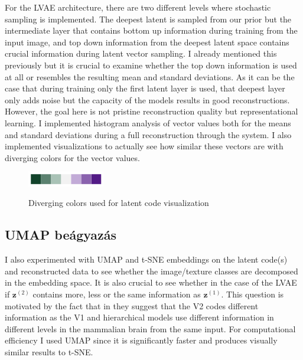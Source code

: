 \documentclass[12pt, english]{article}
\begin{document}
\vspace{4mm}

\par For the LVAE architecture, there are two different levels where stochastic sampling is implemented. The deepest latent is sampled from our prior but the intermediate layer that contains bottom up information during training from the input image, and top down information from the deepest latent space contains crucial information during latent vector sampling. I already mentioned this previously but it is crucial to examine whether the top down information is used at all or resembles the resulting mean and standard deviations. As it can be the case that during training only the first latent layer is used, that deepest layer only adds noise but the capacity of the models results in good reconstructions. However, the goal here is not pristine reconstruction quality but representational learning. I implemented histogram analysis of vector values both for the means and standard deviations during a full reconstruction through the system. I also implemented visualizations to actually see how similar these vectors are with diverging colors for the vector values.

\vspace{4mm}

\begin{figure}[H]
    \centering
    \includegraphics[width=0.3\textwidth]{diverging_color.png}
    \label{fig:diverging_colors}
    \caption{Diverging colors used for latent code visualization}
\end{figure}

\vspace{4mm}

\subsection{UMAP beágyazás}

\vspace{4mm}

\par I also experimented with UMAP \cite{mcinnes2018umap} and  t-SNE \cite{maaten2008visualizing} embeddings on the latent code(s) and reconstructed data to see whether the image/texture classes are decomposed in the embedding space. It is also crucial to see whether in the case of the LVAE if $\bm{z}^{(2)}$ contains more, less or the same information as $\bm{z}^{(1)}$. This question is motivated by the fact that in \cite{ZiembaV2} they suggest that the V2 codes different information as the V1 and hierarchical models use different information in different levels in the mammalian brain from the same input. For computational efficiency I used UMAP since it is significantly faster and produces visually similar results to t-SNE.
\end{document}
